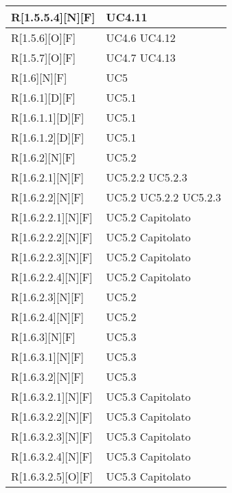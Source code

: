 \begin{longtable}{X | X}
\hline
R[1.5.5.4][N][F] & UC4.11 \\
\hline
R[1.5.6][O][F] & UC4.6 \newline UC4.12 \\
\hline
R[1.5.7][O][F] & UC4.7 \newline UC4.13 \\
\hline
R[1.6][N][F] & UC5 \\
\hline
R[1.6.1][D][F] & UC5.1 \\
\hline
R[1.6.1.1][D][F] & UC5.1 \\
\hline
R[1.6.1.2][D][F] & UC5.1 \\
\hline
R[1.6.2][N][F] & UC5.2 \\
\hline
R[1.6.2.1][N][F] & UC5.2.2 \newline UC5.2.3 \\
\hline
R[1.6.2.2][N][F] & UC5.2 \newline UC5.2.2 \newline UC5.2.3 \\
\hline
R[1.6.2.2.1][N][F] & UC5.2 \newline Capitolato \\
\hline
R[1.6.2.2.2][N][F] & UC5.2 \newline Capitolato \\
\hline
R[1.6.2.2.3][N][F] & UC5.2 \newline Capitolato \\
\hline
R[1.6.2.2.4][N][F] & UC5.2 \newline Capitolato \\
\hline
R[1.6.2.3][N][F] & UC5.2 \\
\hline
R[1.6.2.4][N][F] & UC5.2 \\
\hline
R[1.6.3][N][F] & UC5.3 \\
\hline
R[1.6.3.1][N][F] & UC5.3 \\
\hline
R[1.6.3.2][N][F] & UC5.3 \\
\hline
R[1.6.3.2.1][N][F] & UC5.3 \newline Capitolato \\
\hline
R[1.6.3.2.2][N][F] & UC5.3 \newline Capitolato \\
\hline
R[1.6.3.2.3][N][F] & UC5.3 \newline Capitolato \\
\hline
R[1.6.3.2.4][N][F] & UC5.3 \newline Capitolato \\
\hline
R[1.6.3.2.5][O][F] & UC5.3 \newline Capitolato \\

\end{longtable}
